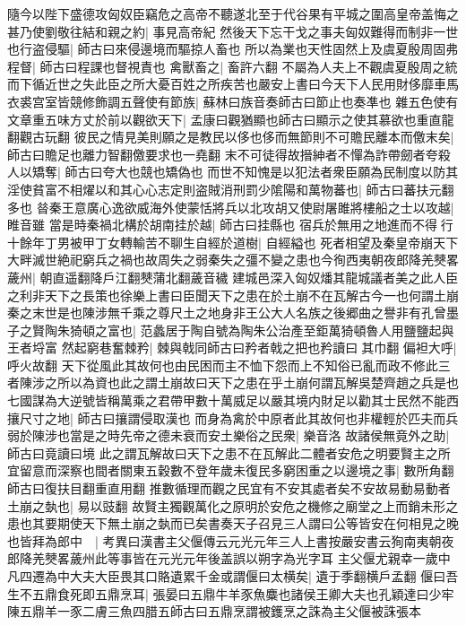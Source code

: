 隨今以陛下盛德攻匈奴臣竊危之高帝不聽遂北至于代谷果有平城之圍高皇帝盖悔之甚乃使劉敬往結和親之約|{
	事見高帝紀}
然後天下忘干戈之事夫匈奴難得而制非一世也行盗侵驅|{
	師古曰來侵邊境而驅掠人畜也}
所以為業也天性固然上及虞夏殷周固弗程督|{
	師古曰程課也督視責也}
禽獸畜之|{
	畜許六翻}
不屬為人夫上不觀虞夏殷周之統而下循近世之失此臣之所大憂百姓之所疾苦也嚴安上書曰今天下人民用財侈靡車馬衣裘宫室皆競修飾調五聲使有節族|{
	蘇林曰族音奏師古曰節止也奏凖也}
雜五色使有文章重五味方丈於前以觀欲天下|{
	孟康曰觀猶顯也師古曰顯示之使其慕欲也重直龍翻觀古玩翻}
彼民之情見美則願之是教民以侈也侈而無節則不可贍民離本而儌末矣|{
	師古曰贍足也離力智翻儌要求也一堯翻}
末不可徒得故搢紳者不憚為詐帶劒者夸殺人以矯奪|{
	師古曰夸大也競也矯偽也}
而世不知愧是以犯法者衆臣願為民制度以防其淫使貧富不相燿以和其心心志定則盗賊消刑罰少隂陽和萬物蕃也|{
	師古曰蕃扶元翻多也}
㫺秦王意廣心逸欲威海外使蒙恬將兵以北攻胡又使尉屠雎將樓船之士以攻越|{
	睢音雖}
當是時秦禍北構於胡南挂於越|{
	師古曰挂縣也}
宿兵於無用之地進而不得行十餘年丁男被甲丁女轉輸苦不聊生自經於道樹|{
	自經縊也}
死者相望及秦皇帝崩天下大畔滅世絶祀窮兵之禍也故周失之弱秦失之彊不變之患也今徇西夷朝夜郎降羌僰畧薉州|{
	朝直遥翻降戶江翻僰蒲北翻薉音穢}
建城邑深入匈奴燔其龍城議者美之此人臣之利非天下之長策也徐樂上書曰臣聞天下之患在於土崩不在瓦解古今一也何謂土崩秦之末世是也陳涉無千乘之尊尺土之地身非王公大人名族之後郷曲之譽非有孔曾墨子之賢陶朱猗頓之富也|{
	范蠡居于陶自號為陶朱公治產至鉅萬猗頓魯人用鹽鹽起與王者埒富}
然起窮巷奮棘矜|{
	棘與戟同師古曰矜者戟之把也矜讀曰其巾翻}
偏袒大呼|{
	呼火故翻}
天下從風此其故何也由民困而主不恤下怨而上不知俗已亂而政不修此三者陳涉之所以為資也此之謂土崩故曰天下之患在乎土崩何謂瓦解吳楚齊趙之兵是也七國謀為大逆號皆稱萬乘之君帶甲數十萬威足以嚴其境内財足以勸其士民然不能西攘尺寸之地|{
	師古曰攘謂侵取漢也}
而身為禽於中原者此其故何也非權輕於匹夫而兵弱於陳涉也當是之時先帝之德未衰而安土樂俗之民衆|{
	樂音洛}
故諸侯無竟外之助|{
	師古曰竟讀曰境}
此之謂瓦解故曰天下之患不在瓦解此二體者安危之明要賢主之所宜留意而深察也間者關東五穀數不登年歲未復民多窮困重之以邊境之事|{
	數所角翻師古曰復扶目翻重直用翻}
推數循理而觀之民宜有不安其處者矣不安故易動易動者土崩之埶也|{
	易以豉翻}
故賢主獨觀萬化之原明於安危之機修之廟堂之上而銷未形之患也其要期使天下無土崩之埶而已矣書奏天子召見三人謂曰公等皆安在何相見之晚也皆拜為郎中　|{
	考異曰漢書主父偃傳云元光元年三人上書按嚴安書云狥南夷朝夜郎降羌僰畧薉州此等事皆在元光元年後盖誤以朔字為光字耳}
主父偃尤親幸一歲中凡四遷為中大夫大臣畏其口賂遺累千金或謂偃曰太横矣|{
	遺于季翻横戶孟翻}
偃曰吾生不五鼎食死即五鼎烹耳|{
	張晏曰五鼎牛羊豕魚麋也諸侯王卿大夫也孔穎達曰少牢陳五鼎羊一豕二膚三魚四腊五師古曰五鼎烹謂被鑊烹之誅為主父偃被誅張本}


